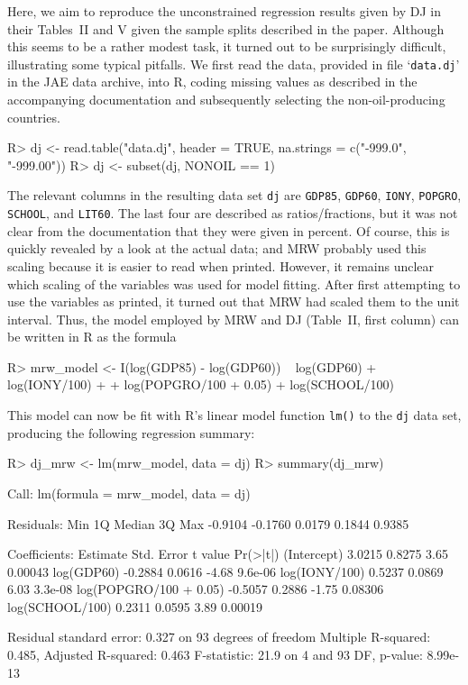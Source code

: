\documentclass[10pt,a4paper,twoside]{article}
\let\code=\texttt
\let\proglang=\textsf
\newcommand{\file}[1]{`\code{#1}'}
\newenvironment{Schunk}{}{}
\begin{document}
Here, we aim to reproduce the unconstrained regression results given by DJ in their Tables~II and V
given the sample splits described in the paper. Although this seems to be a rather modest task, it turned
out to be surprisingly difficult, illustrating some typical pitfalls. We first read the data,
provided in file \file{data.dj} in the JAE data archive, into \proglang{R}, coding missing values
as described in the accompanying documentation and subsequently selecting the non-oil-producing
countries.
%
\begin{Schunk}
\begin{Sinput}
R> dj <- read.table("data.dj", header = TRUE, na.strings = c("-999.0", "-999.00"))
R> dj <- subset(dj, NONOIL == 1)
\end{Sinput}
\end{Schunk}
%
The relevant columns in the resulting data set \code{dj} are \code{GDP85},
\code{GDP60}, \code{IONY}, \code{POPGRO}, \code{SCHOOL}, and \code{LIT60}.
The last four are described as ratios/fractions, but it was not clear from the
documentation that they were given in percent. Of course, this is quickly revealed by
a look at the actual data; and MRW probably used this scaling because it is easier to
read when printed. However, it remains unclear which scaling of the variables
was used for model fitting. After first attempting to use the variables as printed, it
turned out that MRW had scaled them to the unit interval. Thus,
the model employed by MRW and DJ (Table~II, first column)
can be written in \proglang{R} as the formula
%
\begin{Schunk}
\begin{Sinput}
R> mrw_model <- I(log(GDP85) - log(GDP60)) ~ log(GDP60) + log(IONY/100) +
+    log(POPGRO/100 + 0.05) + log(SCHOOL/100)
\end{Sinput}
\end{Schunk}
%
This model can now be fit with \proglang{R}'s linear model
function \code{lm()} to the \code{dj} data set, producing the following regression
summary:
%
\begin{Schunk}
\begin{Sinput}
R> dj_mrw <- lm(mrw_model, data = dj)
R> summary(dj_mrw)
\end{Sinput}
\begin{Soutput}
Call:
lm(formula = mrw_model, data = dj)

Residuals:
    Min      1Q  Median      3Q     Max 
-0.9104 -0.1760  0.0179  0.1844  0.9385 

Coefficients:
                       Estimate Std. Error t value Pr(>|t|)
(Intercept)              3.0215     0.8275    3.65  0.00043
log(GDP60)              -0.2884     0.0616   -4.68  9.6e-06
log(IONY/100)            0.5237     0.0869    6.03  3.3e-08
log(POPGRO/100 + 0.05)  -0.5057     0.2886   -1.75  0.08306
log(SCHOOL/100)          0.2311     0.0595    3.89  0.00019

Residual standard error: 0.327 on 93 degrees of freedom
Multiple R-squared: 0.485,	Adjusted R-squared: 0.463 
F-statistic: 21.9 on 4 and 93 DF,  p-value: 8.99e-13 
\end{Soutput}
\end{Schunk}
\end{document}
